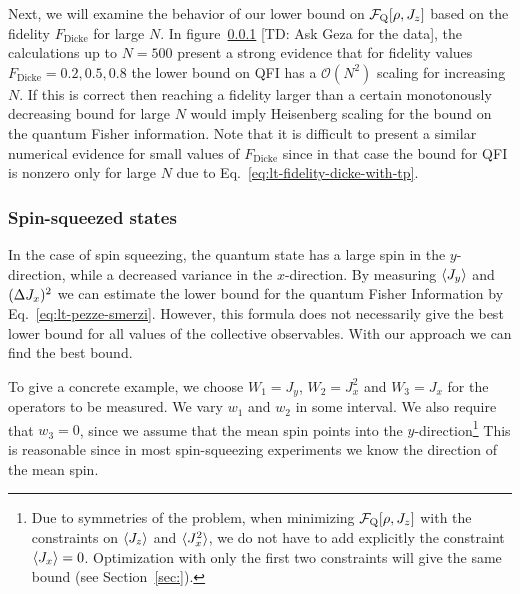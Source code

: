 Next, we will examine the behavior of our lower bound on $\mathcal{F}_{\textnormal{Q}}[\rho,J_z]$ based on the fidelity $F_{\text{Dicke}}$ for large $N$.
In figure~\ref{} [TD: Ask Geza for the data], the calculations up to $N=500$ present a strong evidence that for fidelity values $F_{\text{Dicke}}=0.2,0.5,0.8$ the lower bound on QFI has a $\mathcal{O}(N^2)$ scaling for increasing $N$.
If this is correct then reaching a fidelity larger than a certain monotonously decreasing bound for large $N$ would imply Heisenberg scaling for the bound on the quantum Fisher information.
Note that it is difficult to present a similar numerical evidence for small values of $F_{\text{Dicke}}$ since in that case the bound for QFI is nonzero only for large $N$ due to Eq.~\eqref{eq:lt-fidelity-dicke-with-tp}.

\subsubsection{Spin-squeezed states}

In the case of spin squeezing, the quantum state has a large spin in the $y$-direction, while a decreased variance in the $x$-direction.
By measuring $\langle J_y \rangle$ and $(\Delta J_x )^2$ we can estimate the lower bound for the quantum Fisher Information by Eq.~\eqref{eq:lt-pezze-smerzi}.
However, this formula does not necessarily give the best lower bound for all values of the collective observables.
With our approach we can find the best bound.

To give a concrete example, we choose $W_1=J_y$, $W_2=J_x^2$ and $W_3=J_x$ for the operators to be measured.
We vary $w_1$ and $w_2$ in some interval.
We also require that $w_3=0$, since we assume that the mean spin points into the $y$-direction\footnote{Due to symmetries of the problem, when minimizing $\mathcal{F}_{\textnormal{Q}}[\rho,J_z]$ with the constraints on $\langle J_z \rangle$ and $\langle J_x^2 \rangle$, we do not have to add explicitly the constraint $\langle J_x \rangle=0$.
Optimization with only the first two constraints will give the same bound (see Section~\ref{sec:}).}
This is reasonable since in most spin-squeezing experiments we know the direction of the mean spin.

